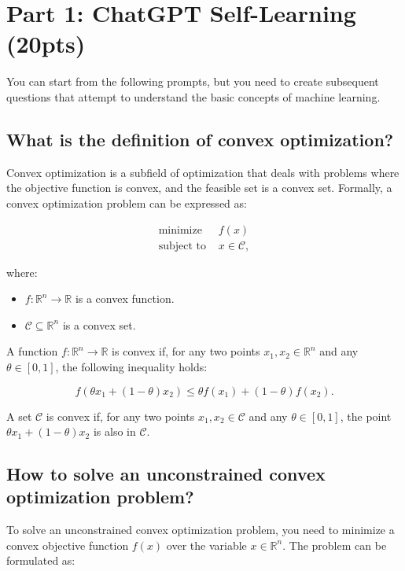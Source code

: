 \section{Part 1: ChatGPT Self-Learning (20pts)}

You can start from the following prompts, but you need to create subsequent questions that attempt to understand the basic concepts of machine learning.

\subsection{What is the definition of convex optimization?}

Convex optimization is a subfield of optimization that deals with problems where the objective function is convex, and the feasible set is a convex set. Formally, a convex optimization problem can be expressed as:

\begin{align*}
\text{minimize } & f(x) \\
\text{subject to } & x \in \mathcal{C},
\end{align*}

where:
\begin{itemize}
  \item \( f: \mathbb{R}^n \to \mathbb{R} \) is a convex function.
  \item \( \mathcal{C} \subseteq \mathbb{R}^n \) is a convex set.
\end{itemize}

A function \( f: \mathbb{R}^n \to \mathbb{R} \) is convex if, for any two points \( x_1, x_2 \in \mathbb{R}^n \) and any \( \theta \in [0,1] \), the following inequality holds:

\[
f(\theta x_1 + (1 - \theta) x_2) \leq \theta f(x_1) + (1 - \theta) f(x_2).
\]

A set \( \mathcal{C} \) is convex if, for any two points \( x_1, x_2 \in \mathcal{C} \) and any \( \theta \in [0,1] \), the point \( \theta x_1 + (1 - \theta) x_2 \) is also in \( \mathcal{C} \).


\subsection{How to solve an unconstrained convex optimization problem?}

To solve an unconstrained convex optimization problem, you need to minimize a convex objective function \( f(x) \) over the variable \( x \in \mathbb{R}^n \). The problem can be formulated as:


